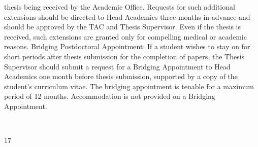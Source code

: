 \documentclass[a4paper,10pt]{article}
\begin{document}
thesis being received by the Academic Office. Requests for such additional extensions
should be directed to Head Academics three months in advance and should be approved by
the TAC and Thesis Supervisor. Even if the thesis is received, such extensions are granted
only for compelling medical or academic reasons.
Bridging Postdoctoral Appointment: If a student wishes to stay on for short periods after
thesis submission for the completion of papers, the Thesis Supervisor should submit a
request for a Bridging Appointment to Head Academics one month before thesis
submission, supported by a copy of the student’s curriculum vitae. The bridging
appointment is tenable for a maximum period of 12 months. Accommodation is not
provided on a Bridging Appointment.

	
  

17	
  
\end{document}
